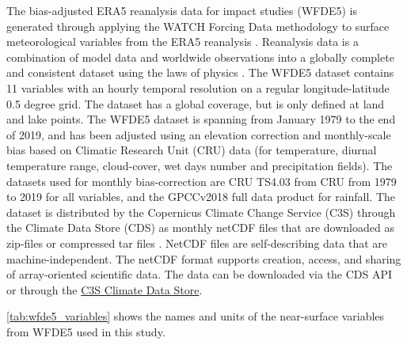 The bias-adjusted ERA5 reanalysis data for impact studies (WFDE5) is generated through applying the WATCH Forcing Data methodology to surface meteorological variables from the ERA5 reanalysis \autocite{cucchiWFDE5BiasadjustedERA52020}. Reanalysis data is a combination of model data and worldwide observations into a globally complete and consistent dataset using the laws of physics \autocite{cucchiWFDE5BiasadjustedERA52020}. The WFDE5 dataset contains 11 variables with an hourly temporal resolution on a regular longitude-latitude 0.5 degree grid. The dataset has a global coverage, but is only defined at land and lake points. The WFDE5 dataset is spanning from January 1979 to the end of 2019, and has been adjusted using an elevation correction and monthly-scale bias based on Climatic Research Unit (CRU) data (for temperature, diurnal temperature range, cloud-cover, wet days number and precipitation fields). The datasets used for monthly bias-correction are CRU TS4.03 from CRU \autocite{harrisVersionCRUTS2020} from 1979 to 2019 for all variables, and the GPCCv2018 full data product \autocite{schneiderGPCCFullData2018} for rainfall. The dataset is distributed by the Copernicus Climate Change Service (C3S) through the Climate Data Store (CDS) as monthly netCDF files that are downloaded as zip-files or compressed tar files \autocite{copernicusclimatechangeserviceSurfaceMeteorologicalVariables2020}. NetCDF files are self-describing data that are machine-independent. The netCDF format supports creation, access, and sharing of array-oriented scientific data. The data can be downloaded via the CDS API or through the \href{https://cds.climate.copernicus.eu/cdsapp#!/dataset/reanalysis-era5-single-levels?tab=overview}{C3S Climate Data Store}.

\autoref{tab:wfde5_variables} shows the names and units of the near-surface variables from WFDE5 used in this study. 


